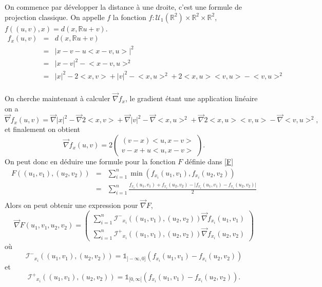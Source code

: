 \documentclass[a4paper,10pt]{article}
\begin{document}
On commence par développer la distance à une droite, c'est une formule de projection classique. On appelle $f$ la fonction $f:\mathcal{U}_1(\mathbb{R}^2)\times\mathbb{R}^2 \times \mathbb{R}^2$, $f((u,v),x)=d(x,\mathbb{R}u+v)$.
\begin{equation}
	\begin{array}{ccc}
		f_x(u,v)&=&d(x,\mathbb{R}u+v)\\
		&=& \big|x-v-u\big<x-v , u\big> \big|^2\\
		&=& \big|x-v\big|^2 -\big<x-v, u\big>^2\\
		&=& \big|x\big|^2-2\big<x,v\big>+\big|v\big|^2 -\big<x, u\big>^2+ 2\big<x, u\big>\big<v, u\big>- \big<v, u\big>^2\\
	\end{array}
\end{equation}

On cherche maintenant à calculer $\overrightarrow{\nabla} f_x$, le gradient étant une application linéaire on a  
\[\overrightarrow{\nabla} f_x (u,v)= \overrightarrow{\nabla}\big|x\big|^2-\overrightarrow{\nabla}2\big<x,v\big>+\overrightarrow{\nabla}\big|v\big|^2 -\overrightarrow{\nabla}\big<x, u\big>^2+ \overrightarrow{\nabla}2\big<x, u\big>\big<v, u\big>- \overrightarrow{\nabla}\big<v, u\big>^2,\]
et finalement on obtient 
\begin{equation}
	\overrightarrow{\nabla} f_x (u,v)=2
	\begin{pmatrix}
		(v-x)\big<u,x-v\big>\\
		v-x+u\big<u,x-v\big>
	\end{pmatrix}.
\end{equation}
On peut donc en déduire une formule pour la fonction $F$ définie dans \eqref{F}
\begin{equation}
	\begin{array}{ccc}
		F((u_1,v_1), (u_2,v_2))&=& \sum_{i=1}^{n}\min (f_{x_i}(u_1,v_1) ,f_{x_i}(u_2,v_2) )\\
		&=& \sum_{i=1}^{n} \frac{f_{x_i}(u_1,v_1)+f_{x_i}(u_2,v_2) -\big|f_{x_i}(u_1,v_1)- f_{x_i}(u_2,v_2) \big| }{2}\\
	\end{array}
\end{equation}
Alors on peut obtenir une expression pour $\overrightarrow{\nabla} F$, 
\begin{equation}
	\overrightarrow{\nabla} F(u_1,v_1, u_2,v_2)=
	\begin{pmatrix}
		\sum_{i=1}^{n}\mathcal{I^{-}}_{x_i}((u_1,v_1),(u_2,v_2))\overrightarrow{\nabla}f_{x_i} (u_1,v_1)\\
		\sum_{i=1}^{n}\mathcal{I^{+}}_{x_i}((u_1,v_1),(u_2,v_2))\overrightarrow{\nabla}f_{x_i} (u_2,v_2)
	\end{pmatrix}
\end{equation}
où \[\mathcal{I^{-}}_{x_i}((u_1,v_1),(u_2,v_2))=\mathds{1}_{]-\infty,0]}(f_{x_i}(u_1,v_1)- f_{x_i}(u_2,v_2))\] et \[\mathcal{I^{+}}_{x_i}((u_1,v_1),(u_2,v_2))=\mathds{1}_{[0,\infty[}(f_{x_i}(u_1,v_1)- f_{x_i}(u_2,v_2)).\]
\end{document}
